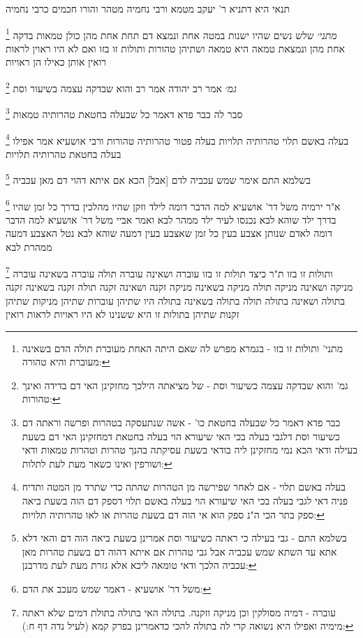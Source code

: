 \documentclass[12pt, openany]{book}
\newcommand{\footnotecomment}[1]{
	\renewcommand\thefootnote{}
	\footnote{#1}}
\newcommand{\commenta}[1]{\footnotecomment{#1}}
\begin{document}
{{תנאי היא דתניא ר' יעקב מטמא ורבי נחמיה מטהר והורו חכמים כרבי נחמיה
\commenta{מתני' ותולות זו בזו - בגמרא מפרש לה שאם היתה האחת מעוברת תולה הדם בשאינה מעוברת והיא טהורה:}
{\large\emph{מתני׳}} שלש נשים שהיו ישנות במטה אחת ונמצא דם תחת אחת מהן כולן טמאות בדקה אחת מהן ונמצאת טמאה היא טמאה ושתיהן טהורות ותולות זו בזו ואם לא היו ראוין לראות רואין אותן כאילו הן ראויות
\commenta{גמ' והוא שבדקה עצמה כשיעור וסת - של מציאתה הילכך מחזקינן האי דם בדידה ואינך טהורות:}
{\large\emph{גמ׳}} אמר רב יהודה אמר רב והוא שבדקה עצמה בשיעור וסת 
\commenta{כבר פדא דאמר כל שבעלה בחטאת כו' - אשה שנתעסקה בטהרות ופרשה וראתה דם כשיעור וסת דלגבי בעלה בכי האי שיעורא הוי בעלה בחטאת דמחזקינן האי דם בשעת בעילה ודאי הכא נמי מחזקינן ליה בודאי בשעת עסיקתה בהנך טהרות וטהרות טמאות ודאי ושורפין ואינו כשאר מעת לעת לתלות:}
סבר לה כבר פדא דאמר כל שבעלה בחטאת טהרותיה טמאות
\commenta{בעלה באשם תלוי - אם לאחר שפירשה מן הטהרות שהתה כדי שתרד מן המטה ותדיח פניה דאי לגבי בעלה בכי האי שיעורא הוי בעלה באשם תלוי דספק דם הוה בשעת ביאה ספק בתר הכי ה"נ ספק הוא אי הוה דם בשעת טהרות או לאו טהרותיה תלויות:}
בעלה באשם תלוי טהרותיה תלויות בעלה פטור טהרותיה טהורות 
ורבי אושעיא אמר אפילו בעלה בחטאת טהרותיה תלויות 
\commenta{בשלמא התם - גבי בעילה כי ראתה כשיעור וסת אמרינן בשעת ביאה הוה דם והאי דלא אתא עד השתא שמש עכביה אבל גבי טהרות אם איתא דהוה דם בשעת טהרות מאן עכביה הלכך ודאי טומאה ליכא אלא גזרת מעת לעת מדרבנן:}
בשלמא התם אימר שמש עכביה לדם [אבל] הכא אם איתא דהוי דם מאן עכביה 
\commenta{משל דר' אושעיא - דאמר שמש מעכב את הדם:}
א"ר ירמיה משל דר' אושעיא למה הדבר דומה לילד וזקן שהיו מהלכין בדרך כל זמן שהיו בדרך ילד שוהא לבא נכנסו לעיר ילד ממהר לבא ואמר אביי משל דר' אושעיא למה הדבר דומה לאדם שנותן אצבע בעין כל זמן שאצבע בעין דמעה שוהא לבא נטל האצבע דמעה ממהרת לבא
\commenta{עוברה - דמיה מסולקין וכן מניקה וזקנה. בתולה האי בתולה בתולת דמים שלא ראתה מימיה ואפילו היא נשואה קרי לה בתולה להכי כדאמרינן בפרק קמא (לעיל נדה דף ח:):}
ותולות זו בזו ת"ר כיצד תולות זו בזו עוברה ושאינה עוברה תולה עוברה בשאינה עוברה
מניקה ושאינה מניקה תולה מניקה בשאינה מניקה זקנה ושאינה זקנה תולה זקנה בשאינה זקנה בתולה ושאינה בתולה תולה בתולה בשאינה בתולה 
היו שתיהן עוברות שתיהן מניקות שתיהן זקנות שתיהן בתולות זו היא ששנינו לא היו ראויות לראות רואין
\clearpage}

}
\end{document}
